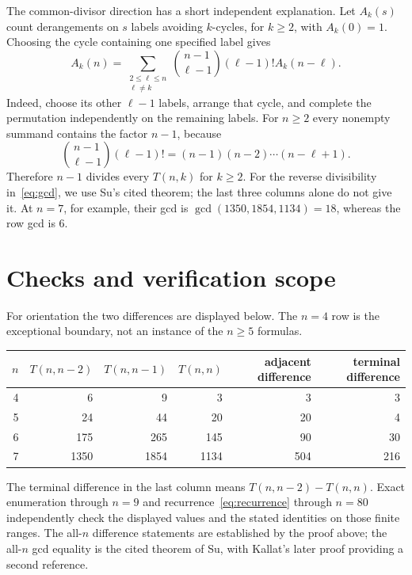 \documentclass[11pt]{article}
\begin{document}
The common-divisor direction has a short independent explanation.
Let $A_k(s)$ count derangements on $s$ labels avoiding $k$-cycles, for $k\geq2$,
with $A_k(0)=1$. Choosing the cycle containing one specified label gives
\begin{equation}\label{eq:recurrence}
 A_k(n)=\sum_{\substack{2\leq\ell\leq n\\\ell\ne k}}
 \binom{n-1}{\ell-1}(\ell-1)!A_k(n-\ell).
\end{equation}
Indeed, choose its other $\ell-1$ labels, arrange that cycle, and complete
the permutation independently on the remaining labels.
For $n\geq2$ every nonempty summand contains the factor $n-1$, because
\[
 \binom{n-1}{\ell-1}(\ell-1)!
 =(n-1)(n-2)\cdots(n-\ell+1).
\]
Therefore $n-1$ divides every $T(n,k)$ for $k\geq2$.
For the reverse divisibility in~\eqref{eq:gcd}, we use Su's cited theorem;
the last three columns alone do not give it. At $n=7$, for example, their
gcd is $\gcd(1350,1854,1134)=18$, whereas the row gcd is $6$.

\section{Checks and verification scope}

For orientation the two differences are displayed below. The $n=4$ row is
the exceptional boundary, not an instance of the $n\geq5$ formulas.
\begin{center}
\begin{tabular}{rrrrrr}
\toprule
$n$&$T(n,n-2)$&$T(n,n-1)$&$T(n,n)$&adjacent difference&terminal difference\\
\midrule
4&6&9&3&3&3\\
5&24&44&20&20&4\\
6&175&265&145&90&30\\
7&1350&1854&1134&504&216\\
\bottomrule
\end{tabular}
\end{center}
The terminal difference in the last column means $T(n,n-2)-T(n,n)$.
Exact enumeration through $n=9$ and recurrence~\eqref{eq:recurrence} through
$n=80$ independently check the displayed values and the stated identities
on those finite ranges. The all-$n$ difference statements are established by
the proof above; the all-$n$ gcd equality is the cited theorem of Su, with
Kallat's later proof providing a second reference.
\end{document}
